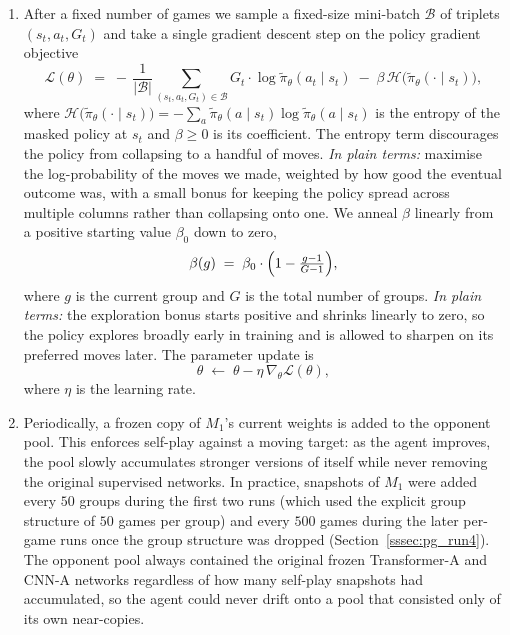 \documentclass[11pt]{article}
\begin{document}
\begin{enumerate}
    \item After a fixed number of games we sample a fixed-size mini-batch
    $\mathcal{B}$ of triplets $(s_t, a_t, G_t)$ and take a single gradient
    descent step on the policy gradient objective
    \[
        \mathcal{L}(\theta)
        \;=\;
        -\,\frac{1}{|\mathcal{B}|}
        \sum_{(s_t, a_t, G_t) \in \mathcal{B}}
            G_t \cdot \log \tilde{\pi}_\theta(a_t \mid s_t)
        \;-\; \beta \, \mathcal{H}\!\bigl(\tilde{\pi}_\theta(\cdot \mid s_t)\bigr),
    \]
    where
    $\mathcal{H}\!\bigl(\tilde{\pi}_\theta(\cdot \mid s_t)\bigr)
     = -\sum_{a} \tilde{\pi}_\theta(a \mid s_t) \log \tilde{\pi}_\theta(a \mid s_t)$
    is the entropy of the masked policy at $s_t$ and $\beta \geq 0$ is its
    coefficient. The entropy term discourages the policy from collapsing to
    a handful of moves.
    \textit{In plain terms:} maximise the log-probability of the
    moves we made, weighted by how good the eventual outcome was,
    with a small bonus for keeping the policy spread across multiple
    columns rather than collapsing onto one.
    We anneal $\beta$ linearly from a positive starting value
    $\beta_0$ down to zero,
    \[
        \beta(g) \;=\; \beta_0 \cdot \Bigl(1 - \tfrac{g - 1}{G - 1}\Bigr),
    \]
    where $g$ is the current group and $G$ is the total number of groups.
    \textit{In plain terms:} the exploration bonus starts positive
    and shrinks linearly to zero, so the policy explores broadly
    early in training and is allowed to sharpen on its preferred
    moves later. The parameter update is
    \[
        \theta \;\leftarrow\; \theta - \eta \, \nabla_\theta \mathcal{L}(\theta),
    \]
    where $\eta$ is the learning rate.

    \item Periodically, a frozen copy of $M_1$'s current weights is added to
    the opponent pool. This enforces self-play against a moving target: as
    the agent improves, the pool slowly accumulates stronger versions of
    itself while never removing the original supervised networks. In
    practice, snapshots of $M_1$ were added every $50$ groups during the
    first two runs (which used the explicit group structure of $50$
    games per group) and every $500$ games during the later per-game
    runs once the group structure was dropped (Section~\ref{sssec:pg_run4}).
    The opponent pool always contained the original frozen
    Transformer-A and CNN-A networks regardless of how many self-play
    snapshots had accumulated, so the agent could never drift onto a
    pool that consisted only of its own near-copies.
\end{enumerate}
\end{document}
